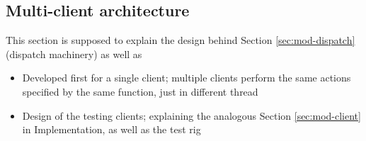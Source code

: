 \subsection{Multi-client architecture}
This section is supposed to explain the design behind Section \ref{sec:mod-dispatch} (dispatch machinery) as well as
\begin{itemize}
  \item Developed first for a single client; multiple clients perform the same actions specified by the same function, just in  different thread
  \item Design of the testing clients; explaining the analogous Section \ref{sec:mod-client} in Implementation, as well as the test rig
\end{itemize}
